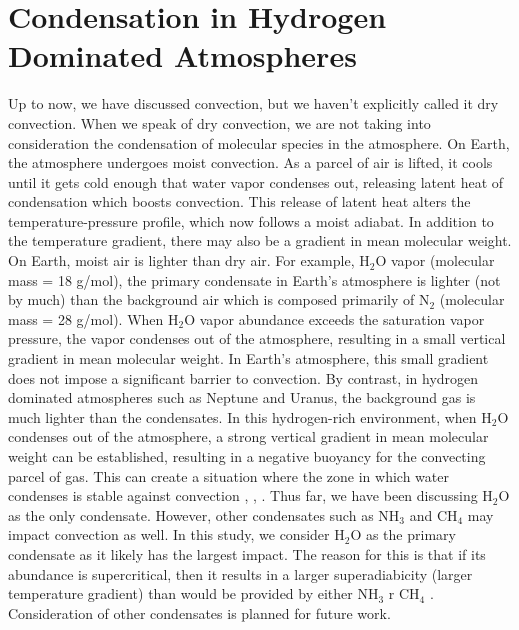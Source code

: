 \documentclass[11pt]{ucscthesisbs}
\begin{document}
\section{Condensation in Hydrogen Dominated Atmospheres}
Up to now, we have discussed convection, but we haven't explicitly called it dry convection. When we speak of dry convection, we are not taking into consideration the condensation of molecular species in the atmosphere. On Earth, the atmosphere undergoes moist convection. As a parcel of air is lifted, it cools until it gets cold enough that water vapor condenses out, releasing latent heat of condensation which boosts convection. This release of latent heat alters the temperature-pressure profile, which now follows a moist adiabat.  In addition to the temperature gradient, there may also be a gradient in mean molecular weight. On Earth, moist air is lighter than dry air. For example, H$_{2}$O vapor (molecular mass = 18 g/mol), the primary condensate in Earth's atmosphere is lighter (not by much) than the background air which is composed primarily of N$_{2}$ (molecular mass = 28 g/mol). When H$_{2}$O vapor abundance exceeds the saturation vapor pressure, the vapor condenses out of the atmosphere, resulting in a small vertical gradient in mean molecular weight. In Earth's atmosphere, this small gradient does not impose a significant barrier to convection. By contrast, in hydrogen dominated atmospheres such as Neptune and Uranus, the background gas is much lighter than the condensates. In this hydrogen-rich environment, when H$_{2}$O condenses out of the atmosphere, a strong vertical gradient in mean molecular weight can be established, resulting in a negative buoyancy for the convecting parcel of gas. This can create a situation where the zone in which water condenses is stable against convection \citep{guillot_1995}, \citep{friedson_2017}, \citep{leconte_2017}. Thus far, we have been discussing H$_{2}$O as the only condensate. However, other condensates such as NH$_{3}$ and CH$_{4}$ may impact convection as well. In this study, we consider H$_{2}$O as the primary condensate as it likely has the largest impact. The reason for this is that if its abundance is supercritical, then it results in a larger superadiabicity (larger temperature gradient) than would be provided by either NH$_{3}$ r CH$_{4}$ \citep{guillot_1995}. Consideration of other condensates is planned for future work.
\end{document}
